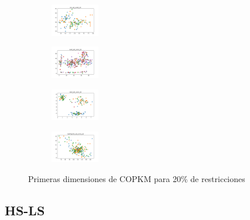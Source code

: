 \begin{figure}[H]
\begin{subfigure}
        \centering
        \includegraphics[width=0.234\textwidth]{img/hs/iris_set_const_20_3773969821_clust.png}
    \end{subfigure}
    \hfill
    \begin{subfigure}
        \centering
        \includegraphics[width=0.234\textwidth]{img/hs/ecoli_set_const_20_3773969821_clust.png}
    \end{subfigure}
    \hfill
    \begin{subfigure}
        \centering
        \includegraphics[width=0.234\textwidth]{img/hs/rand_set_const_20_3773969821_clust.png}
    \end{subfigure}
    \hfill
    \begin{subfigure}
        \centering
        \includegraphics[width=0.234\textwidth]{img/hs/newthyroid_set_const_20_3773969821_clust.png}
    \end{subfigure}
    \caption{Primeras dimensiones de COPKM para 20\% de restricciones}
\end{figure}

\vspace*{\fill}
\newpage


\subsection{HS-LS}

